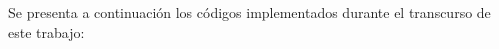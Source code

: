 \chapter{}\label{Ane3}
Se presenta a continuación los códigos implementados durante el transcurso de este trabajo:

